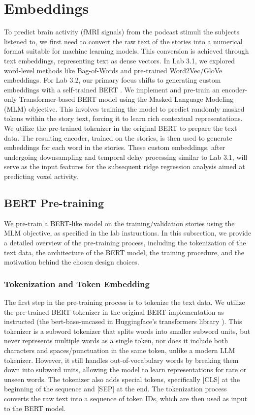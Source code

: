 \documentclass[10pt,letterpaper]{article}
\begin{document}
\section{Embeddings}
To predict brain activity (fMRI signals) from the podcast stimuli the subjects listened to, we first need to convert the raw text of the stories into a numerical format suitable for machine learning models. This conversion is achieved through text embeddings, representing text as dense vectors. In Lab 3.1, we explored word-level methods like Bag-of-Words and pre-trained Word2Vec/GloVe embeddings. For Lab 3.2, our primary focus shifts to generating custom embeddings with a self-trained BERT \cite{devlin2019bert}. We implement and pre-train an encoder-only Transformer-based \cite{vaswani2017attention} BERT model using the Masked Language Modeling (MLM) objective. This involves training the model to predict randomly masked tokens within the story text, forcing it to learn rich contextual representations. We utilize the pre-trained tokenizer in the original BERT to prepare the text data. The resulting encoder, trained on the stories, is then used to generate embeddings for each word in the stories. These custom embeddings, after undergoing downsampling and temporal delay processing similar to Lab 3.1, will serve as the input features for the subsequent ridge regression analysis aimed at predicting voxel activity.

\subsection{BERT Pre-training}
We pre-train a BERT-like model on the training/validation stories using the MLM objective, as specified in the lab instructions. In this subsection, we provide a detailed overview of the pre-training process, including the tokenization of the text data, the architecture of the BERT model, the training procedure, and the motivation behind the chosen design choices.

\subsubsection{Tokenization and Token Embedding}
The first step in the pre-training process is to tokenize the text data. We utilize the pre-trained BERT tokenizer in the original BERT implementation \cite{devlin2019bert} as instructed (the bert-base-uncased in Huggingface's transformers library \cite{wolf2019huggingface}). This tokenizer is a subword tokenizer that splits words into smaller subword units, but never represents multiple words as a single token, nor does it include both characters and spaces/punctuation in the same token, unlike a modern LLM tokenizer. However, it still handles out-of-vocabulary words by breaking them down into subword units, allowing the model to learn representations for rare or unseen words. The tokenizer also adds special tokens, specifically [CLS] at the beginning of the sequence and [SEP] at the end. The tokenization process converts the raw text into a sequence of token IDs, which are then used as input to the BERT model.
\end{document}
